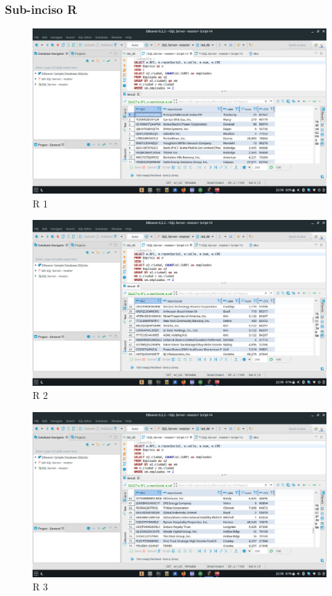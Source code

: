 \documentclass[a4paper, 12pt]{report}
\begin{document}
\subsubsection*{Sub-inciso R}
    \begin{figure}
        \includegraphics[width=\textwidth]
            {img/r1.jpeg}\hfill
    \caption{R 1}
    \end{figure}
    \begin{figure}
        \includegraphics[width=\textwidth]
            {img/r2.jpeg}\hfill
    \caption{R 2}
    \end{figure}
    \begin{figure}
        \includegraphics[width=\textwidth]
            {img/r3.jpeg}\hfill
    \caption{R 3}
    \end{figure}
\end{document}
